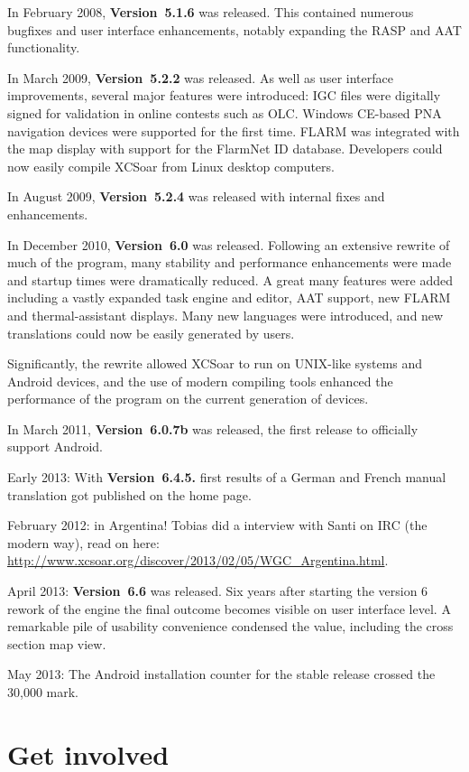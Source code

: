 In February 2008, {\bf Version~5.1.6} was released. This contained 
numerous bugfixes and user interface enhancements, notably expanding 
the RASP and AAT functionality.

In March 2009, {\bf Version~5.2.2} was released. As well as user
interface improvements, several major features were introduced:
IGC files were digitally signed for validation in online contests 
such as OLC.
Windows CE-based PNA navigation devices were supported for the
first time. 
FLARM was integrated with the map display with support for the
FlarmNet ID database.
Developers could now easily compile XCSoar from Linux desktop
computers.

In August 2009, {\bf Version~5.2.4} was released with internal
fixes and enhancements.

In December 2010, {\bf Version~6.0} was released. Following an
extensive rewrite of much of the program, many stability and
performance enhancements were made and startup times were 
dramatically reduced. A great many features were added including 
a vastly expanded task engine and editor, AAT support, new FLARM
and thermal-assistant displays. Many new languages were introduced,
and new translations could now be easily generated by users.

Significantly, the rewrite allowed XCSoar to run on UNIX-like
systems and Android devices, and the use of modern compiling 
tools enhanced the performance of the program on the current
generation of devices.

In March 2011, {\bf Version~6.0.7b} was released, the first
release to officially support Android.

Early 2013: With {\bf Version~6.4.5.} first results of a German and French manual
translation got published on the \xc home page.

February 2012:  in Argentina! Tobias did a interview
with Santi on IRC (the modern way), read on here:  
\url{http://www.xcsoar.org/discover/2013/02/05/WGC_Argentina.html}.

April 2013: {\bf Version~6.6} was released. Six years after starting the version 6 
rework of the \xc engine the final outcome becomes visible on user interface level.
A remarkable pile of usability convenience condensed the \xc value, including
the cross section map view.

May 2013: The Android \xc installation counter for the stable release crossed 
the 30,000 mark.


\section{Get involved}

